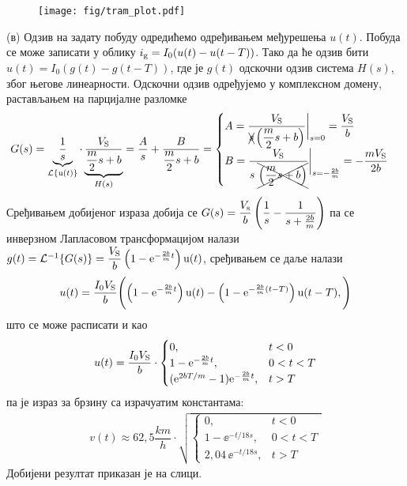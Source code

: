 \begin{figure}[b!]
    \centering
    \texttt{[image: fig/tram\_plot.pdf]}
    \caption{}
\end{figure}

    (в) Одзив на задату побуду одредићемо одређивањем међурешења $u(t)$. Побуда се може записати у облику 
    $i_{\rm g} = I_0 (u(t) - u(t - T))$. Тако да ће одзив бити 
    $u(t) = I_0 (g(t) - g(t - T))$, где је $g(t)$ одскочни одзив система $H(s)$, због његове линеарности. 
    Одскочни одзив одређујемо у комплексном домену, растављањем на парцијалне разломке
    \begin{align}
        G(s) = \underbrace{\dfrac{1}{s}}_{\mathcal{L}\left\{{\rm u}(t)\right\}} \cdot \underbrace{\dfrac{V_{\rm S}}{ \dfrac{m}{2} s + b } }_{H(s)}
        = \dfrac{A}{s} + \dfrac{B}{\dfrac{m}{2} s + b} 
        = 
        \begin{cases}
            A =  \dfrac{V_{\rm S}}{ \xcancel{s}\left( \dfrac{m}{2} s + b\right) } \bigg|_{s = 0} = \dfrac{V_{\rm S}}{b} \\
            B =  \dfrac{V_{\rm S}}{ {s} \,\, \xcancel{\left( \dfrac{m}{2} s + b\right) } } \bigg|_{s = -\frac{2b}{m}} = 
            -\dfrac{m V_{\rm S}}{2b}
        \end{cases}
    \end{align}
    Сређивањем добијеног израза добија се 
    $
    G(s) = \dfrac{V_{\rm s}}{b} \left( \dfrac{1}{s} - \dfrac{1}{s + \frac{2b}{m}} \right)$ \vspace*{1mm} 
    па се инверзном Лапласовом трансформацијом налази
    $g(t) = \mathcal{L}^{-1} \{ G(s) \} = \dfrac{V_{\rm S}}{b} \left(1 - {\rm e}^{ -\frac{2b}{m} t } \right) {\rm u}(t) $, 
    сређивањем се даље налази
    \begin{equation}
    u(t) = \dfrac{I_0 V_{\rm S}}{b} \Biggl(
        \left(1 - {\rm e}^{ -\frac{2b}{m} t } \right) {\rm u}(t) 
        -
        \left(1 - {\rm e}^{ -\frac{2b}{m} (t - T)} \right) {\rm u}(t - T),
    \Biggr)
    \end{equation}
    што се може расписати и као 
    \begin{eqnarray}
        u(t) = \dfrac{I_0 V_{\rm S}}{b} \cdot 
        \begin{cases}
            0 , & t < 0 \\
            1 - {\rm e}^{-\frac{2b}{m}t} , & 0 < t < T \\
            ( {\rm e}^{2bT/m} - 1) {\rm e}^{-\frac{2b}{m}t} , & t > T 
        \end{cases}
    \end{eqnarray}
    па је израз за брзину са израчуатим константама: 
    \begin{eqnarray}
        v(t) \approx 62,5 \unit{\dfrac{km}{h}} \cdot 
        \sqrt{
        \begin{cases}
            0 , & t < 0 \\
            1 - \ee^{-t/18\unit{s}} , & 0 < t < T \\
            2,04\, \ee^{-t/18\unit{s}} , & t > T 
        \end{cases}
        }
    \end{eqnarray} 
    Добијени резултат приказан је на слици.




    
